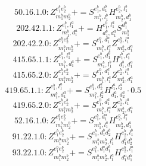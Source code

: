\documentclass[letterpaper,10pt,fleqn,leqno,onecolumn]{article}
\begin{document}
\begin{equation} \;\;\;\;\;\;  50.16.1.0: Z^{e_{1}^{b}e_{2}^{b}}_{m_{1}^{b}m_{2}^{b}}+=S^{e_{1}^{b},d_{1}^{b}}_{m_{1}^{b},l_{1}^{b}}H^{e_{2}^{b},l_{1}^{b}}_{m_{2}^{b},d_{1}^{b}} \end{equation}
\begin{equation} \;\;\;\;\;\;  202.42.1.1: Z^{e_{1}^{b},l_{1}^{a}}_{m_{1}^{b},d_{1}^{a}}+=H^{e_{1}^{b},l_{1}^{a}}_{d_{1}^{b},d_{1}^{a}}S^{d_{1}^{b}}_{m_{1}^{b}} \end{equation}
\begin{equation} \;\;\;\;\;\;  202.42.2.0: Z^{e_{1}^{b}e_{2}^{b}}_{m_{1}^{b}m_{2}^{b}}+=S^{e_{1}^{b},d_{1}^{a}}_{m_{1}^{b},l_{1}^{a}}Z^{e_{2}^{b},l_{1}^{a}}_{m_{2}^{b},d_{1}^{a}} \end{equation}
\begin{equation} \;\;\;\;\;\;  415.65.1.1: Z^{e_{1}^{b},l_{1}^{a}}_{m_{1}^{b},d_{1}^{a}}+=S^{e_{1}^{b},d_{1}^{b}}_{m_{1}^{b},l_{1}^{b}}H^{l_{1}^{b},l_{1}^{a}}_{d_{1}^{b},d_{1}^{a}} \end{equation}
\begin{equation} \;\;\;\;\;\;  415.65.2.0: Z^{e_{1}^{b}e_{2}^{b}}_{m_{1}^{b}m_{2}^{b}}+=S^{e_{1}^{b},d_{1}^{a}}_{m_{1}^{b},l_{1}^{a}}Z^{e_{2}^{b},l_{1}^{a}}_{m_{2}^{b},d_{1}^{a}} \end{equation}
\begin{equation} \;\;\;\;\;\;  419.65.1.1: Z^{e_{1}^{b},l_{1}^{a}}_{m_{1}^{b},d_{1}^{a}}+=S^{e_{1}^{b},d_{2}^{a}}_{m_{1}^{b},l_{2}^{a}}H^{l_{1}^{a},l_{2}^{a}}_{d_{1}^{a},d_{2}^{a}}\cdot 0.5 \end{equation}
\begin{equation} \;\;\;\;\;\;  419.65.2.0: Z^{e_{1}^{b}e_{2}^{b}}_{m_{1}^{b}m_{2}^{b}}+=S^{e_{1}^{b},d_{1}^{a}}_{m_{1}^{b},l_{1}^{a}}Z^{e_{2}^{b},l_{1}^{a}}_{m_{2}^{b},d_{1}^{a}} \end{equation}
\begin{equation} \;\;\;\;\;\;  52.16.1.0: Z^{e_{1}^{b}e_{2}^{b}}_{m_{1}^{b}m_{2}^{b}}+=S^{e_{1}^{b},d_{1}^{a}}_{m_{1}^{b},l_{1}^{a}}H^{e_{2}^{b},l_{1}^{a}}_{m_{2}^{b},d_{1}^{a}} \end{equation}
\begin{equation} \;\;\;\;\;\;  91.22.1.0: Z^{e_{1}^{b}e_{2}^{b}}_{m_{1}^{b}m_{2}^{b}}+=S^{e_{1}^{b},d_{1}^{b}d_{2}^{b}}_{m_{1}^{b}m_{2}^{b},l_{1}^{b}}H^{e_{2}^{b},l_{1}^{b}}_{d_{1}^{b}d_{2}^{b}} \end{equation}
\begin{equation} \;\;\;\;\;\;  93.22.1.0: Z^{e_{1}^{b}e_{2}^{b}}_{m_{1}^{b}m_{2}^{b}}+=S^{e_{1}^{b},d_{1}^{a}d_{1}^{b}}_{m_{1}^{b}m_{2}^{b},l_{1}^{a}}H^{e_{2}^{b},l_{1}^{a}}_{d_{1}^{a}d_{1}^{b}} \end{equation}
\end{document}
